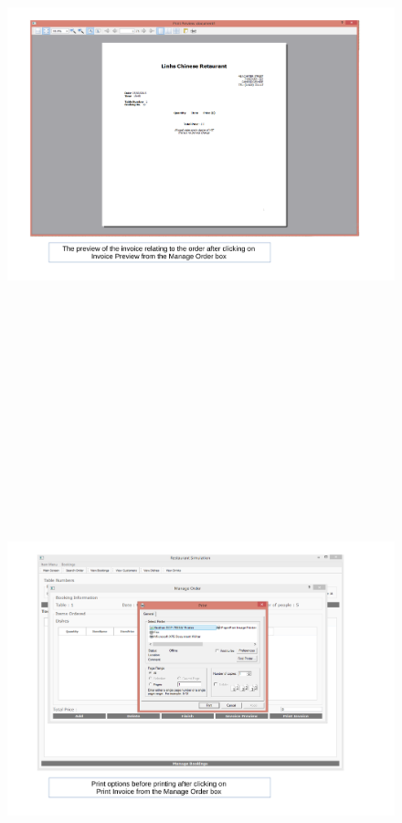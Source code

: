 \begin{landscape}
\begin{figure}[H]
    \includegraphics[height = 15cm]{./Maintenance/images/screen13}
    \caption{} \label{fig:screen13}
\end{figure}

\begin{figure}[H]
    \includegraphics[height = 15cm]{./Maintenance/images/screen14}
    \caption{} \label{fig:screen14}
\end{figure}


\end{landscape}
